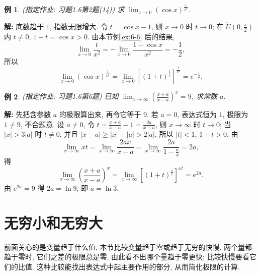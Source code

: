 \documentclass[UTF8,openany]{ctexbook}
\theoremstyle{chinesetextbook}
\newtheorem{example}{例}[section]
\newenvironment{cnsolution}{\par\indent\textbf{解:} \ignorespaces}{\par}
\begin{document}
\begin{example}
\textnormal{(指定作业: 习题1.6第2题(14))} 求 $\displaystyle\lim_{x\to0}(\cos x)^{\frac1{x^2}}$.
\end{example}
\begin{cnsolution}
底数趋于 $1$, 指数无限增大. 令 $t=\cos x-1$, 则 $x\to0$ 时 $t\to0$; 在 $\displaystyle\mathring U\left(0,\frac\pi2\right)$ 内 $t\ne0$, $1+t=\cos x>0$. 由本节例\ref{ex:6-6} 后的结果,
\[
\lim_{x\to0}\frac t{x^2}=-\lim_{x\to0}\frac{1-\cos x}{x^2}=-\frac12,
\]
所以
\[
\lim_{x\to0}(\cos x)^{\frac1{x^2}}=\lim_{x\to0}\left[(1+t)^{\frac1t}\right]^{\frac t{x^2}}=e^{-\frac12}.
\]
\end{cnsolution}
\begin{example}
\textnormal{(指定作业: 习题1.6第6题)} 已知 $\displaystyle\lim_{x\to\infty}\left(\frac{x+a}{x-a}\right)^x=9$, 求常数 $a$.
\end{example}
\begin{cnsolution}
先把含参数 $a$ 的极限算出来, 再令它等于 $9$. 若 $a=0$, 表达式恒为 $1$, 极限为 $1\ne9$, 不合题意. 设 $a\ne0$, 令 $\displaystyle t=\frac{x+a}{x-a}-1=\frac{2a}{x-a}$, 则 $x\to\infty$ 时 $t\to0$; 当 $|x|>3|a|$ 时 $t\ne0$, 并且 $|x-a|\ge|x|-|a|>2|a|$, 所以 $|t|<1$, $1+t>0$. 由
\[
\lim_{x\to\infty}xt=\lim_{x\to\infty}\frac{2ax}{x-a}=\lim_{x\to\infty}\frac{2a}{1-\frac ax}=2a,
\]
得
\[
\lim_{x\to\infty}\left(\frac{x+a}{x-a}\right)^x=\lim_{x\to\infty}\left[(1+t)^{\frac1t}\right]^{xt}=e^{2a}.
\]
由 $e^{2a}=9$ 得 $2a=\ln9$, 即 $a=\ln3$.
\end{cnsolution}
\section{无穷小和无穷大}
前面关心的是变量趋于什么值, 本节比较变量趋于零或趋于无穷的快慢. 两个量都趋于零时, 它们之差的极限总是零, 由此看不出哪个量趋于零更快; 比较快慢要看它们的比值. 这种比较能找出表达式中起主要作用的部分, 从而简化极限的计算.
\end{document}
